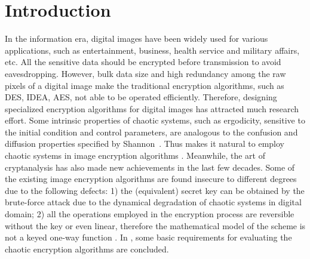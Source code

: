 \documentclass[3p,preprint,11pt]{elsarticle}
\begin{document}
\section{Introduction}
In the information era, digital images have been widely used for various applications, such
as entertainment, business,
health service and military affairs, etc. All the sensitive data should be encrypted before transmission to
avoid eavesdropping. However, bulk data size and high redundancy among the raw pixels of a digital image
make the traditional encryption algorithms, such as DES, IDEA, AES, not able to be operated efficiently.
Therefore, designing specialized encryption algorithms for digital images has attracted much research effort.
Some intrinsic properties of chaotic systems, such as ergodicity, sensitive to the initial condition and control
parameters, are analogous to the confusion and diffusion properties specified by Shannon~\cite{Shannon:Entropy:BSTJ49}.
Thus makes it natural to employ chaotic systems in image encryption algorithms
\cite{Fridrich:ChaoticImageEncryption:IJBC98,Jakimoski:Blockcipher:IEEECirSys01,Chen:3DChaoticCipher:CSF04,Zhang:ImageCrypt:SCSF07,
Zhu:HyperEnc:OC12,
Francois:ImageEncChaos:SGIC12,Mao:3Dbakermap:Optic2009,Huang:pixelShuffle:Optic2009,Pareek:subdiffusion:CNSNS10}.
Meanwhile, the art of cryptanalysis has also made new achievements in the last few decades.
Some of the existing image encryption algorithms
are found insecure
 \cite{Alvarez:AnalyTable:PLA04,Solak:AnalyFridrich:IJBC10,Chengqing:OptimalofPermutation:SG11,LeoYu:AnalyofAlternate:IJBC12,
LeoYu:BreakColor:ND12,Liaoxf:AttackonTent:IEEECirSys06,Shujun:quantitativePermutation:SGIC08,chengqing:breakingPareek:CNSNS11}
to different degrees due to the following defects:
1) the (equivalent) secret key can be obtained by the brute-force attack due to the dynamical degradation
of chaotic systems in digital domain;
2) all the operations employed in the encryption process are reversible without the key or even linear, therefore the
mathematical model of the scheme is not a keyed one-way function \cite{Xuejia:definingCypto:2012}.
In \cite{shujun:BasicRrequirement:IJBC06}, some basic requirements for evaluating the chaotic encryption algorithms
are concluded.
\end{document}
